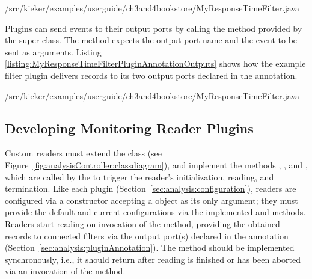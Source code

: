\setJavaCodeListing
%
{\customComponentsBookstoreApplicationDir/src/kieker/examples/userguide/ch3and4bookstore/MyResponseTimeFilter.java}

\noindent Plugins can send events to their output ports by calling the %
 method provided by the super class. The method expects the %
output port name and the event to be sent as arguments. Listing~%
\ref{listing:MyResponseTimeFilterPluginAnnotationOutputs} %
shows how the example filter plugin  delivers records %
to its two output ports declared in the  annotation.

\setJavaCodeListing
%
{\customComponentsBookstoreApplicationDir/src/kieker/examples/userguide/ch3and4bookstore/MyResponseTimeFilter.java}


\subsection{Developing Monitoring Reader Plugins}\label{sec:analysis:reader}

\noindent Custom readers must extend the class %
 (see Figure~\ref{fig:analysisController:classdiagram}), %
and implement the methods , , and , %
which are called by the  to trigger the reader's initialization, %
reading, and termination. Like each plugin (Section~\ref{sec:analysis:configuration}), %
readers are configured via a constructor accepting a  object %
as its only argument; they must provide the default and current configurations %
via the implemented  and  %
methods. Readers start reading on invocation of the  method, %
providing the obtained records to connected filters via the output port(s) %
declared in the  annotation (Section~\ref{sec:analysis:pluginAnnotation}). %
The  method should be implemented synchronously, i.e., it should %
return after reading is finished or has been aborted via an invocation of the %
 method.

